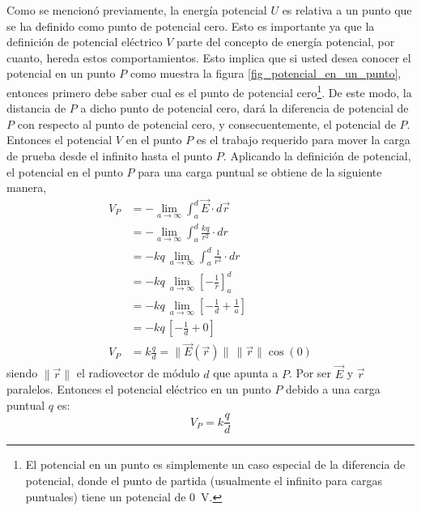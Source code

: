 Como se mencionó previamente, la energía potencial \(U\) es relativa a un punto que se ha definido como punto de potencial cero. Esto es importante ya que la definición de potencial eléctrico \(V\) parte del concepto de energía potencial, por cuanto, hereda estos comportamientos. Esto implica que si usted desea conocer el potencial en un punto \(P\) como muestra la figura \ref{fig_potencial_en_un_punto}, entonces primero debe saber cual es el punto de potencial cero\footnote{El potencial en un punto es simplemente un caso especial de la diferencia de potencial, donde el punto de partida (usualmente el infinito para cargas puntuales) tiene un potencial de \qty{0}{\volt}.}. De este modo, la distancia de \(P\) a dicho punto de potencial cero, dará la diferencia de potencial de \(P\) con respecto al punto de potencial cero, y consecuentemente, el potencial de \(P\). Entonces el potencial \(V\) en el punto \(P\) es el trabajo requerido para mover la carga de prueba desde el infinito hasta el punto \(P\). Aplicando la definición de potencial, el potencial en el punto \(P\) para una carga puntual se obtiene de la siguiente manera,
\begin{align*}
    V_P &= - \lim_{a \to \infty}\int_{a}^d \vec{E} \cdot d\vec{r}\\
        &= - \lim_{a \to \infty}\int_{a}^d \frac{kq}{r^2} \cdot dr\\
        &= -kq \, \lim_{a \to \infty} \int_{a}^d \frac{1}{r^2} \cdot dr\\
        &= -kq \, \lim_{a \to \infty} \left[ -\frac{1}{r} \right]_{a}^d\\
        &= -kq \, \lim_{a \to \infty} \left[ -\frac{1}{d} + \frac{1}{a} \right]\\
        &= -kq \, \left[ -\frac{1}{d} + 0 \right] \\
    V_P &= k\frac{q}{d} = \lVert\vec{E} (\vec{r})\rVert \, \lVert\vec{r}\rVert \cos(0)
\end{align*}
siendo \(\lVert \vec{r}\rVert\) el radiovector de módulo \(d\) que apunta a \(P\). Por ser \(\vec{E}\) y \(\vec{r}\) paralelos. Entonces el potencial eléctrico en un punto \(P\) debido a una carga puntual \(q\) es:
\begin{equation}
    \boxed{V_P = k\frac{q}{d}}
    \label{eq:potential_point_charge}
\end{equation}

